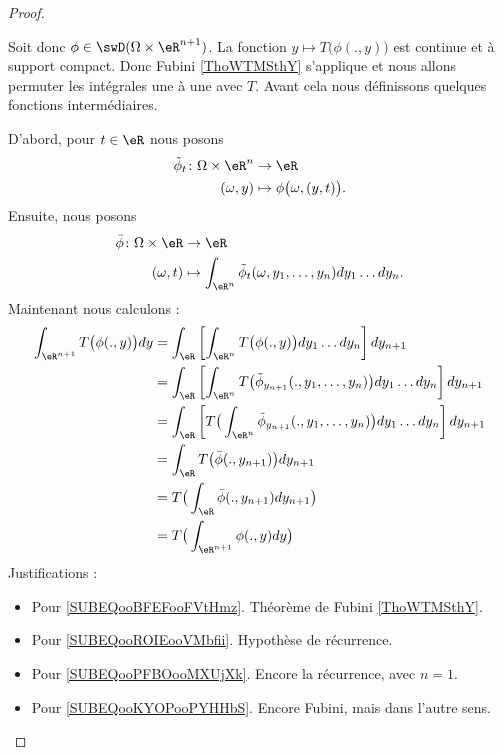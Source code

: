 \begin{proof}
\begin{subproof}
        Soit donc \( \phi\in\swD(\Omega\times \eR^{n+1})\). La fonction \( y\mapsto T\big( \phi(.,y) \big)\) est continue et à support compact. Donc Fubini \ref{ThoWTMSthY} s'applique et nous allons permuter les intégrales une à une avec \( T\). Avant cela nous définissons quelques fonctions intermédiaires.

        D'abord, pour \( t\in \eR\) nous posons
        \begin{equation}
            \begin{aligned}
                \tilde\phi_t\colon \Omega\times \eR^n&\to \eR \\
                (\omega,y)&\mapsto \phi\big( \omega,(y,t) \big). 
            \end{aligned}
        \end{equation}
        Ensuite, nous posons
        \begin{equation}
            \begin{aligned}
                \bar \phi\colon \Omega\times \eR&\to \eR \\
                (\omega,t)&\mapsto \int_{\eR^n}\tilde \phi_t(\omega, y_1,\ldots, y_n)dy_1\ldots dy_n. 
            \end{aligned}
        \end{equation}
        Maintenant nous calculons :
        \begin{subequations}
            \begin{align}
                \int_{\eR^{n+1}}T\big( \phi(.,y) \big)dy&=\int_{\eR}\left[ \int_{\eR^n} T\big( \phi(.,y) \big)dy_1\ldots dy_n \right]dy_{n+1}       \label{SUBEQooBFEFooFVtHmz}\\
                &=\int_{\eR}\left[ \int_{\eR^n}T\big( \tilde \phi_{y_{n+1}}(., y_1,\ldots, y_n) \big)dy_1\ldots dy_n \right]dy_{n+1}\\
                &=\int_{\eR}\left[ T\big( \int_{\eR^n}\tilde \phi_{y_{n+1}}(.,y_1,\ldots, y_n) \big)dy_1\ldots dy_n \right]dy_{n+1} \label{SUBEQooROIEooVMbfii}\\
                &=\int_{\eR}T\big( \bar\phi(.,y_{n+1}) \big)dy_{n+1}\\
                &=T\big( \int_{\eR}\bar\phi(.,y_{n+1})dy_{n+1} \big)  \label{SUBEQooPFBOooMXUjXk}\\
                &=T\big( \int_{\eR^{n+1}}\phi(.,y)dy \big)      \label{SUBEQooKYOPooPYHHbS}
            \end{align}
        \end{subequations}
        Justifications :
        \begin{itemize}
            \item Pour \eqref{SUBEQooBFEFooFVtHmz}. Théorème de Fubini \ref{ThoWTMSthY}.
            \item Pour \eqref{SUBEQooROIEooVMbfii}. Hypothèse de récurrence.
            \item Pour \eqref{SUBEQooPFBOooMXUjXk}. Encore la récurrence, avec \( n=1\).
            \item Pour \eqref{SUBEQooKYOPooPYHHbS}. Encore Fubini, mais dans l'autre sens.
        \end{itemize}
        

\end{subproof}
\end{proof}
